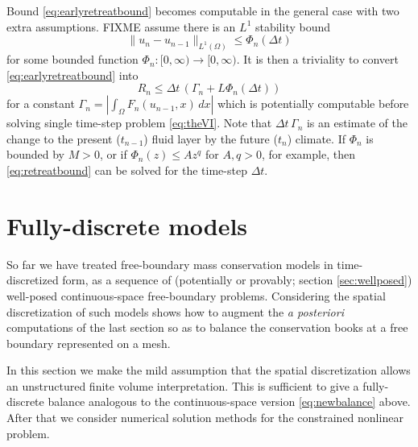 \documentclass[final,leqno,onefignum,onetabnum]{siamltex1213bueler}
\begin{document}
Bound \eqref{eq:earlyretreatbound} becomes computable in the general case with two extra assumptions.  FIXME assume there is an $L^1$ stability bound
\begin{equation}
\|u_n-u_{n-1}\|_{L^1(\Omega)} \le \Phi_n(\Delta t)
\end{equation}
for some bounded function $\Phi_n : [0,\infty) \to [0,\infty)$.  It is then a triviality to convert \eqref{eq:earlyretreatbound} into
\begin{equation}
R_n \le \Delta t\,\left(\Gamma_n + L \Phi_n(\Delta t)\right)   \label{eq:retreatbound}
\end{equation}
for a constant $\Gamma_n=\left|\int_{\Omega} F_n(u_{n-1},x)\,dx\right|$ which is potentially computable before solving single time-step problem \eqref{eq:theVI}.  Note that $\Delta t\,\Gamma_n$ is an estimate of the change to the present ($t_{n-1}$) fluid layer by the future ($t_n$) climate.  If $\Phi_n$ is bounded by $M>0$, or if $\Phi_n(z) \le A z^q$ for $A,q>0$, for example, then \eqref{eq:retreatbound} can be solved for the time-step $\Delta t$.


\section{Fully-discrete models}  \label{sec:spacediscretized}

So far we have treated free-boundary mass conservation models in time-discretized form, as a sequence of (potentially or provably; section \ref{sec:wellposed}) well-posed continuous-space free-boundary problems.  Considering the spatial discretization of such models shows how to augment the \emph{a posteriori} computations of the last section so as to balance the conservation books at a free boundary represented on a mesh.

In this section we make the mild assumption that the spatial discretization allows an unstructured finite volume \cite{LeVeque2002} interpretation.  This is sufficient to give a fully-discrete balance analogous to the continuous-space version \eqref{eq:newbalance} above.  After that we consider numerical solution methods for the constrained nonlinear problem.
\end{document}
